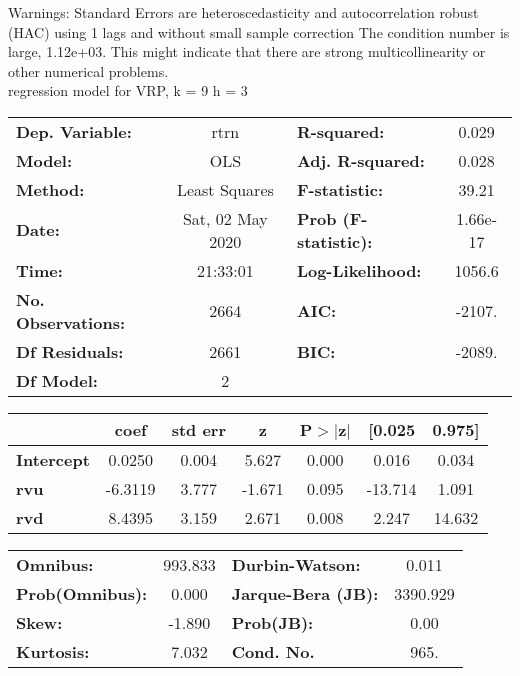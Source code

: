Warnings: \newline
 [1] Standard Errors are heteroscedasticity and autocorrelation robust (HAC) using 1 lags and without small sample correction \newline
 [2] The condition number is large, 1.12e+03. This might indicate that there are \newline
 strong multicollinearity or other numerical problems.\\ 

regression model for VRP, k = 9 h = 3\begin{center}
\begin{tabular}{lclc}
\toprule
\textbf{Dep. Variable:}    &       rtrn       & \textbf{  R-squared:         } &     0.029   \\
\textbf{Model:}            &       OLS        & \textbf{  Adj. R-squared:    } &     0.028   \\
\textbf{Method:}           &  Least Squares   & \textbf{  F-statistic:       } &     39.21   \\
\textbf{Date:}             & Sat, 02 May 2020 & \textbf{  Prob (F-statistic):} &  1.66e-17   \\
\textbf{Time:}             &     21:33:01     & \textbf{  Log-Likelihood:    } &    1056.6   \\
\textbf{No. Observations:} &        2664      & \textbf{  AIC:               } &    -2107.   \\
\textbf{Df Residuals:}     &        2661      & \textbf{  BIC:               } &    -2089.   \\
\textbf{Df Model:}         &           2      & \textbf{                     } &             \\
\bottomrule
\end{tabular}
\begin{tabular}{lcccccc}
                   & \textbf{coef} & \textbf{std err} & \textbf{z} & \textbf{P$> |$z$|$} & \textbf{[0.025} & \textbf{0.975]}  \\
\midrule
\textbf{Intercept} &       0.0250  &        0.004     &     5.627  &         0.000        &        0.016    &        0.034     \\
\textbf{rvu}       &      -6.3119  &        3.777     &    -1.671  &         0.095        &      -13.714    &        1.091     \\
\textbf{rvd}       &       8.4395  &        3.159     &     2.671  &         0.008        &        2.247    &       14.632     \\
\bottomrule
\end{tabular}
\begin{tabular}{lclc}
\textbf{Omnibus:}       & 993.833 & \textbf{  Durbin-Watson:     } &    0.011  \\
\textbf{Prob(Omnibus):} &   0.000 & \textbf{  Jarque-Bera (JB):  } & 3390.929  \\
\textbf{Skew:}          &  -1.890 & \textbf{  Prob(JB):          } &     0.00  \\
\textbf{Kurtosis:}      &   7.032 & \textbf{  Cond. No.          } &     965.  \\
\bottomrule
\end{tabular}
\end{center}

